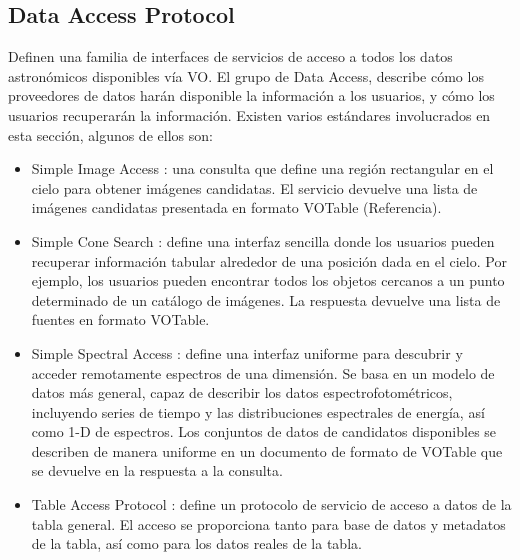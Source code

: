 \subsection{Data Access Protocol}

Definen una familia de interfaces de servicios de acceso a todos los datos
astronómicos disponibles vía VO.  El grupo de Data Access, describe cómo los
proveedores de datos harán disponible la información a los usuarios, y cómo los
usuarios recuperarán la información. Existen varios estándares involucrados
en esta sección, algunos de ellos son:

\begin{itemize}
	\item Simple Image Access \cite{sia}: una consulta que define una región
rectangular en el cielo para obtener imágenes candidatas. El servicio devuelve
una lista de imágenes candidatas presentada en formato VOTable (Referencia).
	\item Simple Cone Search \cite{scs}: define una interfaz sencilla donde los
usuarios pueden recuperar información tabular alrededor de una posición dada en
el cielo. Por ejemplo, los usuarios pueden encontrar todos los objetos cercanos
a un punto determinado de un catálogo de imágenes. La respuesta devuelve una
lista de fuentes en formato VOTable.
	\item Simple Spectral Access \cite{ssa}: define una interfaz uniforme para
descubrir y acceder remotamente espectros de una dimensión. Se basa en un
modelo de datos más general, capaz de describir los datos espectrofotométricos,
incluyendo series de tiempo y las distribuciones espectrales de energía, así
como 1-D de espectros. Los conjuntos de datos de candidatos disponibles se
describen de manera uniforme en un documento de formato de VOTable que se
devuelve en la respuesta a la consulta.
	\item Table Access Protocol \cite{tap}: define un protocolo de servicio de acceso
a datos de la tabla general. El acceso se proporciona tanto para base de datos
y metadatos de la tabla, así como para los datos reales de la tabla.
\end{itemize}
